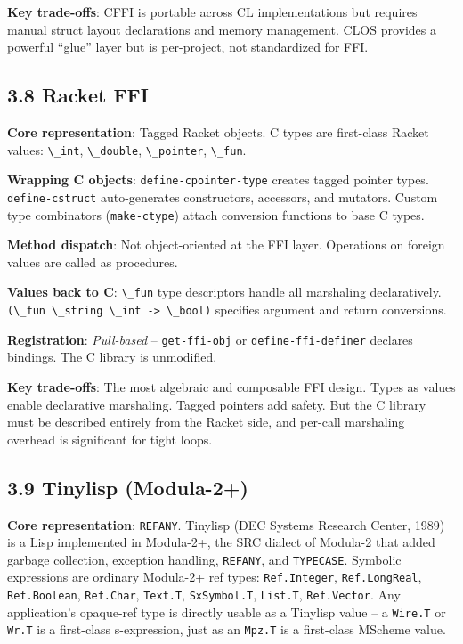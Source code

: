 \documentclass[
  12pt,
]{report}
\newcommand{\passthrough}[1]{#1}
\begin{document}
\textbf{Key trade-offs}: CFFI is portable across CL implementations but
requires manual struct layout declarations and memory management. CLOS
provides a powerful ``glue'' layer but is per-project, not standardized
for FFI.

\subsection{3.8 Racket FFI}\label{racket-ffi}

\textbf{Core representation}: Tagged Racket objects. C types are
first-class Racket values: \passthrough{\lstinline!\_int!},
\passthrough{\lstinline!\_double!}, \passthrough{\lstinline!\_pointer!},
\passthrough{\lstinline!\_fun!}.

\textbf{Wrapping C objects}:
\passthrough{\lstinline!define-cpointer-type!} creates tagged pointer
types. \passthrough{\lstinline!define-cstruct!} auto-generates
constructors, accessors, and mutators. Custom type combinators
(\passthrough{\lstinline!make-ctype!}) attach conversion functions to
base C types.

\textbf{Method dispatch}: Not object-oriented at the FFI layer.
Operations on foreign values are called as procedures.

\textbf{Values back to C}: \passthrough{\lstinline!\_fun!} type
descriptors handle all marshaling declaratively.
\passthrough{\lstinline!(\_fun \_string \_int -> \_bool)!} specifies
argument and return conversions.

\textbf{Registration}: \emph{Pull-based} --
\passthrough{\lstinline!get-ffi-obj!} or
\passthrough{\lstinline!define-ffi-definer!} declares bindings. The C
library is unmodified.

\textbf{Key trade-offs}: The most algebraic and composable FFI design.
Types as values enable declarative marshaling. Tagged pointers add
safety. But the C library must be described entirely from the Racket
side, and per-call marshaling overhead is significant for tight loops.

\subsection{3.9 Tinylisp (Modula-2+)}\label{tinylisp-modula-2}

\textbf{Core representation}: \passthrough{\lstinline!REFANY!}. Tinylisp
(DEC Systems Research Center, 1989) is a Lisp implemented in Modula-2+,
the SRC dialect of Modula-2 that added garbage collection, exception
handling, \passthrough{\lstinline!REFANY!}, and
\passthrough{\lstinline!TYPECASE!}. Symbolic expressions are ordinary
Modula-2+ ref types: \passthrough{\lstinline!Ref.Integer!},
\passthrough{\lstinline!Ref.LongReal!},
\passthrough{\lstinline!Ref.Boolean!},
\passthrough{\lstinline!Ref.Char!}, \passthrough{\lstinline!Text.T!},
\passthrough{\lstinline!SxSymbol.T!}, \passthrough{\lstinline!List.T!},
\passthrough{\lstinline!Ref.Vector!}. Any application's opaque-ref type
is directly usable as a Tinylisp value -- a
\passthrough{\lstinline!Wire.T!} or \passthrough{\lstinline!Wr.T!} is a
first-class s-expression, just as an \passthrough{\lstinline!Mpz.T!} is
a first-class MScheme value.
\end{document}
